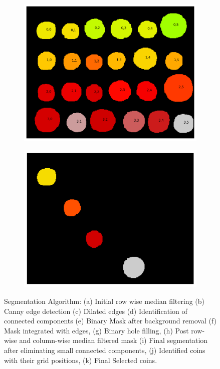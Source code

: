 \documentclass[11pt]{article}
\begin{document}
\begin{figure}[H]
    \begin{subfigure}{.45\textwidth}
        \centering
        \includegraphics[width=\linewidth]{figs/q1c_identified_coins.png}
        \caption{}
    \end{subfigure}%
    \begin{subfigure}{.45\textwidth}
        \centering
        \includegraphics[width=\linewidth]{figs/q1c_selected_coins.png}
        \caption{}
    \end{subfigure}%
    
    \caption{Segmentation Algorithm: (a) Initial row wise median filtering (b) Canny edge detection (c) Dilated edges (d) Identification of connected components (e) Binary Mask after background removal (f) Mask integrated with edges, (g) Binary hole filling, (h) Post row-wise and column-wise median filtered mask (i) Final segmentation after eliminating small connected components, (j) Identified coins with their grid positions, (k) Final Selected coins.}
    \label{fig:coin_segmentation_steps}
\end{figure}
\end{document}
